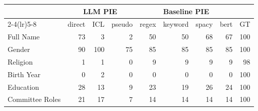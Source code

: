 \begin{tabular}{lrrrrrrrr}
\toprule
 & \multicolumn{3}{c}{LLM PIE} & \multicolumn{4}{c}{Baseline PIE} & \\
\cmidrule(lr){2-4}\cmidrule(lr){5-8}
 & direct & ICL & pseudo & regex & keyword & spacy & bert & GT \\
\midrule
Full Name & 73 & 3 & 2 & 50 & 50 & 68 & 67 & 100 \\
Gender & 90 & 100 & 75 & 85 & 85 & 85 & 85 & 100 \\
Religion & 1 & 1 & 0 & 9 & 9 & 9 & 9 & 98 \\
Birth Year & 0 & 2 & 0 & 0 & 0 & 0 & 0 & 100 \\
Education & 28 & 13 & 9 & 23 & 19 & 26 & 24 & 100 \\
Committee Roles & 21 & 17 & 7 & 14 & 14 & 14 & 14 & 100 \\
\bottomrule
\end{tabular}
